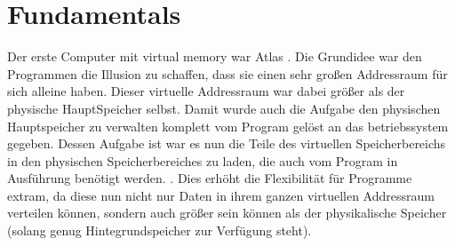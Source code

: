 \chapter{Fundamentals} %
\label{chap:fund}

%

Der erste Computer mit virtual memory war Atlas \cite{fotheringham1961dynamic}. Die Grundidee war den
Programmen die Illusion zu schaffen, dass sie einen sehr großen Addressraum für sich alleine haben.
Dieser virtuelle Addressraum war dabei größer als der physische HauptSpeicher selbst.
Damit wurde auch die Aufgabe den physischen Hauptspeicher zu verwalten komplett vom Program gelöst
an das betriebssystem gegeben. Dessen Aufgabe ist war es nun die Teile des virtuellen Speicherbereichs
in den physischen Speicherbereiches zu laden, die auch vom Program in Ausführung benötigt werden.
\cite{denning1970virtual}.
Dies erhöht die Flexibilität für Programme extram, da diese nun nicht nur Daten in ihrem ganzen
virtuellen Addressraum verteilen können, sondern auch größer sein können als der physikalische Speicher
(solang genug Hintegrundspeicher zur Verfügung steht).



